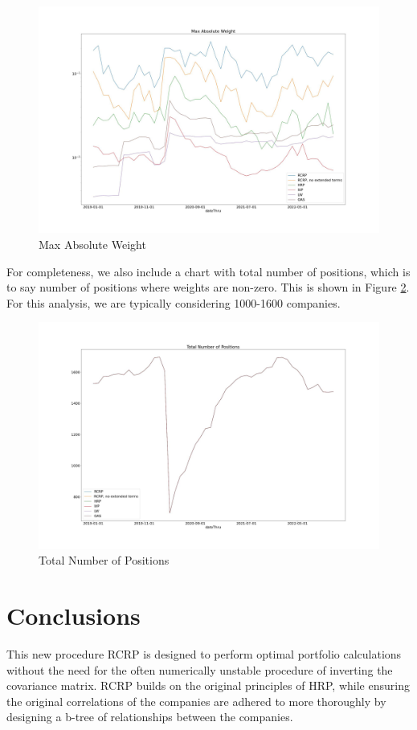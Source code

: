 \documentclass[10pt,twoside,titlepage]{article}   %
\begin{document}
\begin{figure}[!h]
\includegraphics[width = 1.00\textwidth]{image4.jpg}
\vspace{-1.75\baselineskip}
\caption{Max Absolute Weight}
\label{fig4}
\end{figure}
For completeness, we also include a chart with total number of positions, 
which is to say number of positions where weights are non-zero. 
This is shown in Figure \ref{fig5}. 
For this analysis, we are typically considering 1000-1600 companies.
\noindent
\begin{figure}[!h]
\includegraphics[width = 1.00\textwidth]{image5.jpg}
\vspace{-1.75\baselineskip}
\caption{Total Number of Positions}
\label{fig5}
\end{figure}

\section{Conclusions}\label{sec-Conclusions}
This new procedure RCRP is designed to perform optimal portfolio calculations without the need for the often numerically unstable procedure of inverting the covariance matrix. 
RCRP builds on the original principles of HRP, while ensuring the original correlations of the companies are adhered to more thoroughly by designing a b-tree of relationships between the companies. 
\end{document}
